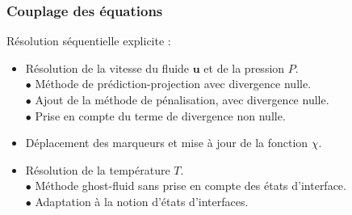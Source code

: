 \documentclass{beamer}
\newcommand{\vect}[1]{\bm{#1}}
\begin{document}
\begin{frame}
    \frametitle{Couplage des équations}
        \footnotesize
        \begin{ceablock}{Résolution séquentielle explicite :}
        \begin{itemize}
            \item Résolution de la vitesse du fluide $\vect{u}$ et de la pression $P$.\\
				\color{cea_texte!70}$\bullet$ Méthode de prédiction-projection avec divergence nulle.\\
				$\bullet$ Ajout de la méthode de pénalisation, avec divergence nulle.\\
				$\bullet$ Prise en compte du terme de divergence non nulle.\color{cea_texte}
			
            \item Déplacement des marqueurs et mise à jour de la fonction $\chi$.
            \item Résolution de la température $T$.\\
            	\color{cea_texte!70}$\bullet$ Méthode ghost-fluid sans prise en compte des états d'interface.\\
            	$\bullet$ Adaptation  à la notion d'états d'interfaces.           
        \end{itemize}
        \end{ceablock}
    
\end{frame}
\end{document}
